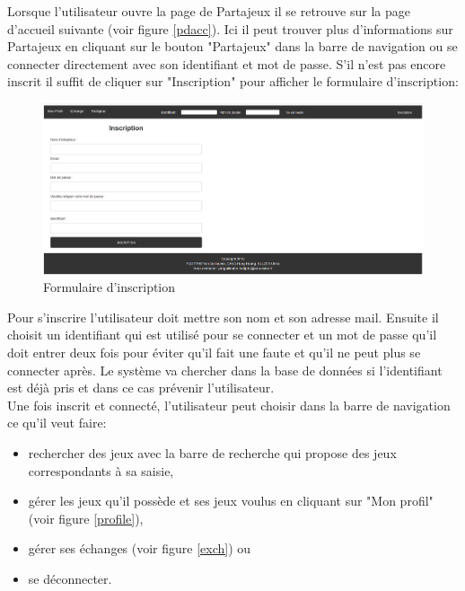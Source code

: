 \documentclass[a4paper,12pt,abstracton,titlepage]{scrartcl}
\begin{document}
Lorsque l'utilisateur ouvre la page de Partajeux il se retrouve sur la page d'accueil suivante (voir figure \ref{pdacc}). Ici il peut trouver plus d'informations sur Partajeux en cliquant sur le bouton "Partajeux" dans la barre de navigation ou se connecter directement avec son identifiant et mot de passe. S'il n'est pas encore inscrit il suffit de cliquer sur "Inscription" pour afficher le formulaire d'inscription:\\
\begin{figure}[h]
  \centering
    \includegraphics[width=\textwidth]{./doc/02_inscription.png}
	\caption{Formulaire d'inscription}
	\label{insc}
\end{figure}

Pour s'inscrire l'utilisateur doit mettre son nom et son adresse mail. Ensuite il choisit un identifiant qui est utilisé pour se connecter et un mot de passe qu'il doit entrer deux fois pour éviter qu'il fait une faute et qu'il ne peut plus se connecter après. Le système va chercher dans la base de données si l'identifiant est déjà pris et dans ce cas prévenir l'utilisateur.\\
Une fois inscrit et connecté, l'utilisateur peut choisir dans la barre de navigation ce qu'il veut faire:\\
\begin{itemize}
\item rechercher des jeux avec la barre de recherche qui propose des jeux correspondants à sa saisie,
\item gérer les jeux qu'il possède et ses jeux voulus en cliquant sur "Mon profil" (voir figure \ref{profile}),
\item gérer ses échanges (voir figure \ref{exch}) ou
\item se déconnecter.\\
\end{itemize}
\end{document}
